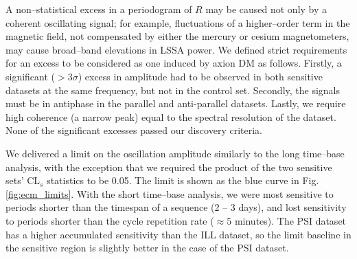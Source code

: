 A non--statistical excess in a periodogram of $R$ may be caused not only by a coherent oscillating signal;
for example, fluctuations of a higher--order term in the magnetic field, not compensated by either the mercury or cesium magnetometers, may cause broad--band elevations in LSSA power.
We defined strict requirements for an excess to be considered as one induced by axion DM as follows.
Firstly, a significant ($>3\sigma$) excess in amplitude had to be observed in both sensitive datasets at the same frequency, but not in the control set. Secondly, the signals must be in antiphase in the parallel and anti-parallel datasets. Lastly, we require high coherence (a narrow peak) equal to the spectral resolution of the dataset. None of the significant excesses passed our discovery criteria.

We delivered a limit on the oscillation amplitude similarly to the long time--base analysis, with the exception that we required the product of the two sensitive sets' $\mathrm{CL}_s$ statistics to be 0.05.
The limit is shown as the blue curve in Fig.\,\ref{fig:ecm_limits}.
With the short time--base analysis, we were most sensitive to periods shorter than the timespan of a sequence (2 -- 3 days), and lost sensitivity to periods shorter than the cycle repetition rate ($\approx 5$ minutes).
The PSI dataset has a higher accumulated sensitivity than the ILL dataset, so the limit baseline in the sensitive region is slightly better in the case of the PSI dataset.

